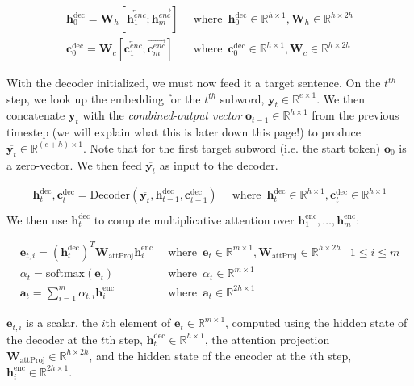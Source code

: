 \documentclass{assignment format}
\newcommand{\Real}{\mathbb{R}}
\newcommand{\henc}{\mathbf{h}^{\text{enc}}}
\newcommand{\hencfw}[1]{\overrightarrow{\mathbf{h}^{enc}_{#1}}}
\newcommand{\hencbw}[1]{\overleftarrow{\mathbf{h}^{enc}_{#1}}}
\newcommand{\cencfw}[1]{\overrightarrow{\mathbf{c}^{enc}_{#1}}}
\newcommand{\cencbw}[1]{\overleftarrow{\mathbf{c}^{enc}_{#1}}}
\newcommand{\hdec}{\mathbf{h}^{\text{dec}}}
\newcommand{\cdec}{\mathbf{c}^{\text{dec}}}
\begin{document}
\begin{align}
    \hdec_0 = \mathbf{W}_{h}[\hencbw{1}; \hencfw{m}] \enspace &\text{where} \enspace \hdec_0 \in \Real^{h \times 1}, \mathbf{W}_{h} \in \Real^{h \times 2h}\\
    \cdec_0 = \mathbf{W}_{c}[\cencbw{1}; \cencfw{m}] \enspace &\text{where} \enspace \cdec_0 \in \Real^{h \times 1}, \mathbf{W}_{c} \in \Real^{h \times 2h}
\end{align}


With the decoder initialized, we must now feed it a target sentence. On the $t^{th}$ step, we look up the embedding for the $t^{th}$ subword,  $\mathbf{y}_t \in \Real^{e \times 1}$. We then concatenate $\mathbf{y}_t$ with the \textit{combined-output vector} $\mathbf{o}_{t-1} \in \Real^{h \times 1}$ from the previous timestep (we will explain what this is later down this page!\@) to produce $\overline{\mathbf{y}_t} \in \Real^{(e+h) \times 1}$. Note that for the first target subword (i.e. the start token) $\mathbf{o}_{0}$ is a zero-vector. We then feed $\overline{\mathbf{y}_t}$ as input to the decoder. 

\begin{align}
    \hdec_t, \cdec_t = \text{Decoder}(\overline{\mathbf{y}_t}, \hdec_{t-1}, \cdec_{t-1}) \enspace &\text{where} \enspace \hdec_t \in \Real^{h \times 1}, \cdec_t \in \Real^{h \times 1}\\
\end{align}
We then use $\hdec_t$ to compute  multiplicative attention over $\henc_1, \dots, \henc_m$:

\begin{align}
    \mathbf{e}_{t, i} = (\hdec_t)^T\mathbf{W}_{\text{attProj}}\henc_i \enspace &\text{where} \enspace \mathbf{e}_{t} \in \Real^{m \times 1}, \mathbf{W}_{\text{attProj}}\in \Real^{h \times 2h} & 1 \le i \le m \\
    \alpha_t= \text{softmax}(\mathbf{e}_t) \enspace &\text{where} \enspace \alpha_t \in \Real^{m \times 1}\\
    \mathbf{a}_t = \sum_{i=1}^{m}\alpha_{t,i}\henc_i \enspace &\text{where} \enspace \mathbf{a}_t \in \Real^{2h \times 1}
\end{align}
 
$\mathbf{e}_{t, i}$ is a scalar, the $i$th element of $\mathbf{e}_{t} \in \Real^{m \times 1}$, computed using the hidden state of the decoder at the $t$th step, $\hdec_t \in \Real^{h \times 1}$, the attention projection $\mathbf{W}_{\text{attProj}} \in \Real^{h \times 2h}$, and the hidden state of the encoder at the $i$th step, $\henc_i \in \Real^{2h \times 1}$.
\end{document}
